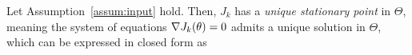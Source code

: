 \begin{proposition}\label{pro:local minimum}
Let Assumption~\ref{assum:input} hold. Then, $J_k$ has a \emph{unique stationary point} in $\Theta$, meaning the system of equations $\nabla J_k({ \mathrm{\theta} }) = 0$ admits a unique solution in $\Theta$, which can be expressed in closed form as 

\end{proposition}
